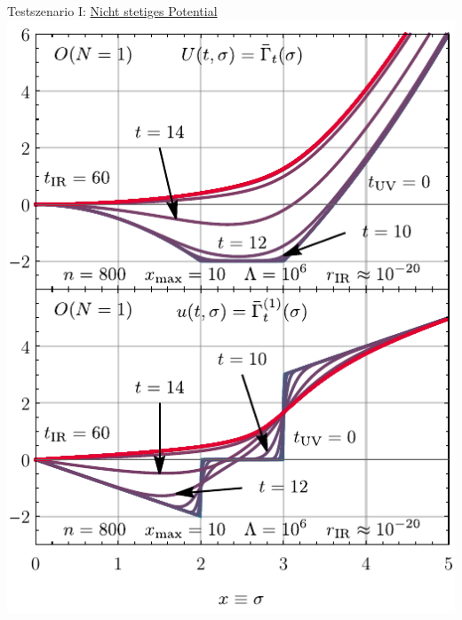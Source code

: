 {\begin{frame}{Testszenario I: \hyperlink{0dxmax}{Nicht stetiges Potential}}
	\includegraphics[width=0.47\framewidth]{../0d/figures/sc_i_on=1_n=800_xmax=10_lambda=1.0e6_tir=60_rg_flow.pdf}
\end{frame}
}

